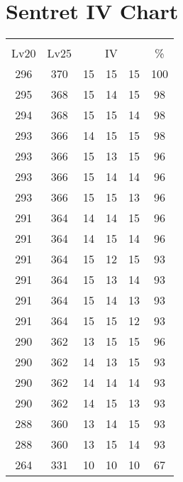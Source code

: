 \documentclass{article}%
\begin{document}
%
\normalsize%
\section{Sentret IV Chart}%
\label{sec:Sentret IV Chart}%
\renewcommand{\arraystretch}{1.5}%
\begin{tabular}{|c|c|c|c|c|c|}%
\hline%
\multicolumn{6}{|c|}{\textcolor{white}{ 
\linebreak{Sentret}
}%
\cellcolor{black}}\\%
\multicolumn{1}{|c}{Lv20}&\multicolumn{1}{c|}{Lv25}&\multicolumn{3}{c|}{IV}&\multicolumn{1}{|c|}{\%}\\%
\hline%
\rowcolor{color100}%
296&370&15&15&15&100\\%
\hline%
\rowcolor{color98}%
295&368&15&14&15&98\\%
\hline%
\rowcolor{color98}%
294&368&15&15&14&98\\%
\hline%
\rowcolor{color98}%
293&366&14&15&15&98\\%
\hline%
\rowcolor{color96}%
293&366&15&13&15&96\\%
\hline%
\rowcolor{color96}%
293&366&15&14&14&96\\%
\hline%
\rowcolor{color96}%
293&366&15&15&13&96\\%
\hline%
\rowcolor{color96}%
291&364&14&14&15&96\\%
\hline%
\rowcolor{color96}%
291&364&14&15&14&96\\%
\hline%
\rowcolor{color93}%
291&364&15&12&15&93\\%
\hline%
\rowcolor{color93}%
291&364&15&13&14&93\\%
\hline%
\rowcolor{color93}%
291&364&15&14&13&93\\%
\hline%
\rowcolor{color93}%
291&364&15&15&12&93\\%
\hline%
\rowcolor{color96}%
290&362&13&15&15&96\\%
\hline%
\rowcolor{color93}%
290&362&14&13&15&93\\%
\hline%
\rowcolor{color93}%
290&362&14&14&14&93\\%
\hline%
\rowcolor{color93}%
290&362&14&15&13&93\\%
\hline%
\rowcolor{color93}%
288&360&13&14&15&93\\%
\hline%
\rowcolor{color93}%
288&360&13&15&14&93\\%
\hline%
\rowcolor{color91}%
264&331&10&10&10&67\\%
\end{tabular}

%
\end{document}

